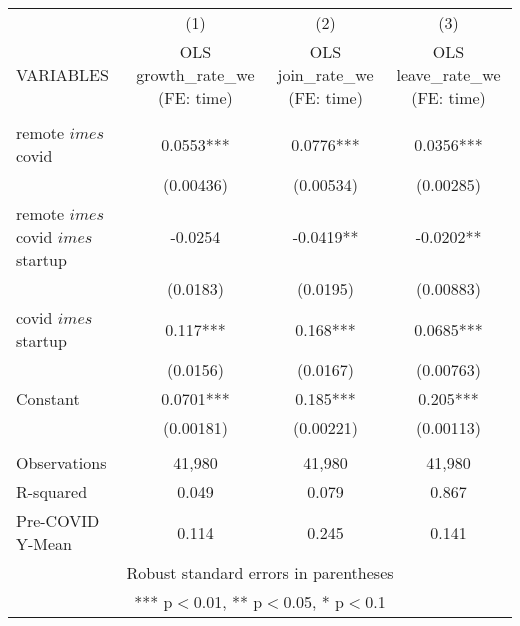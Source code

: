 \documentclass[]{article}
\begin{document}
\begin{tabular}{lccc} \hline
 & (1) & (2) & (3) \\
VARIABLES & OLS growth\_rate\_we (FE: time) & OLS join\_rate\_we (FE: time) & OLS leave\_rate\_we (FE: time) \\ \hline
 &  &  &  \\
remote $	imes$ covid & 0.0553*** & 0.0776*** & 0.0356*** \\
 & (0.00436) & (0.00534) & (0.00285) \\
remote $	imes$ covid $	imes$ startup & -0.0254 & -0.0419** & -0.0202** \\
 & (0.0183) & (0.0195) & (0.00883) \\
covid $	imes$ startup & 0.117*** & 0.168*** & 0.0685*** \\
 & (0.0156) & (0.0167) & (0.00763) \\
Constant & 0.0701*** & 0.185*** & 0.205*** \\
 & (0.00181) & (0.00221) & (0.00113) \\
 &  &  &  \\
Observations & 41,980 & 41,980 & 41,980 \\
R-squared & 0.049 & 0.079 & 0.867 \\
 Pre-COVID Y-Mean & 0.114 & 0.245 & 0.141 \\ \hline
\multicolumn{4}{c}{ Robust standard errors in parentheses} \\
\multicolumn{4}{c}{ *** p$<$0.01, ** p$<$0.05, * p$<$0.1} \\
\end{tabular}
\end{document}
